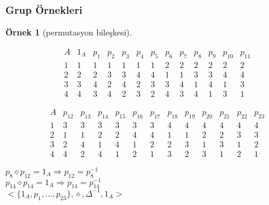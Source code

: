 \documentclass[dvipsnames]{beamer}
\theoremstyle{definition}
\theoremstyle{example}
\newtheorem{ornek}[theorem]{Örnek}
\theoremstyle{plain}
\begin{document}
\begin{frame}
  \frametitle{Grup Örnekleri}

  \begin{ornek}[permutasyon bileşkesi]
    \begin{tiny}
    \[
      \begin{array}{c|cccccccccccccccccccccccc}
        A & 1_{A}  & p_{1}  & p_{2}  & p_{3}  & p_{4}  & p_{5}
          & p_{6}  & p_{7}  & p_{8}  & p_{9}  & p_{10} & p_{11}\\\hline
        1 &   1    &   1    &   1    &   1    &   1    &  1
          &   2    &   2    &   2    &   2    &   2    &  2\\
        2 &   2    &   2    &   3    &   3    &   4    &  4
          &   1    &   1    &   3    &   3    &   4    &  4\\
        3 &   3    &   4    &   2    &   4    &   2    &  3
          &   3    &   4    &   1    &   4    &   1    &  3\\
        4 &   4    &   3    &   4    &   2    &   3    &  2
          &   4    &   3    &   4    &   1    &   3    &  1
      \end{array}
    \]

    \[
      \begin{array}{c|cccccccccccccccccccccccc}
        A & p_{12} & p_{13} & p_{14} & p_{15} & p_{16} & p_{17}
          & p_{18} & p_{19} & p_{20} & p_{21} & p_{22} & p_{23}\\\hline
        1 &   3    &   3    &   3    &   3    &   3    &  3
          &   4    &   4    &   4    &   4    &   4    &  4\\
        2 &   1    &   1    &   2    &   2    &   4    &  4
          &   1    &   1    &   2    &   2    &   3    &  3\\
        3 &   2    &   4    &   1    &   4    &   1    &  2
          &   2    &   3    &   1    &   3    &   1    &  2\\
        4 &   4    &   2    &   4    &   1    &   2    &  1
          &   3    &   2    &   3    &   1    &   2    &  1
      \end{array}
    \]
    \end{tiny}

    \pause
    \medskip
    $p_8 \diamond p_{12}=1_A \Rightarrow p_{12} = p_8^{-1}$\\
    $p_{14} \diamond p_{14}=1_A \Rightarrow p_{14} = p_{14}^{-1}$\\

    \pause
    \bigskip
    $<\{1_A,p_1,\dots,p_{23}\},\diamond,\Delta^{-1},1_A>$
  \end{ornek}
\end{frame}
\end{document}
